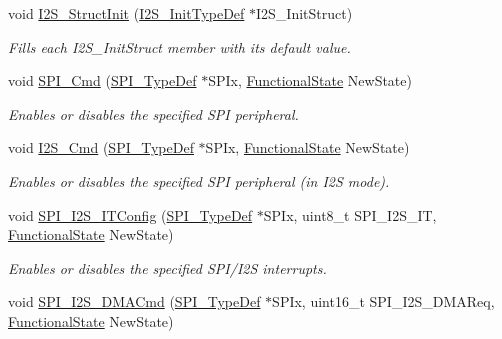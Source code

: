 \begin{DoxyCompactItemize}
void \hyperlink{group___s_p_i___private___functions_ga7470ec1d0759fdeeb42c7fe71a3b41b7}{I2\+S\+\_\+\+Struct\+Init} (\hyperlink{struct_i2_s___init_type_def}{I2\+S\+\_\+\+Init\+Type\+Def} $\ast$I2\+S\+\_\+\+Init\+Struct)
\begin{DoxyCompactList}\small\item\em Fills each I2\+S\+\_\+\+Init\+Struct member with its default value. \end{DoxyCompactList}\item 
void \hyperlink{group___s_p_i___private___functions_gaa31357879a65ee1ed7223f3b9114dcf3}{S\+P\+I\+\_\+\+Cmd} (\hyperlink{struct_s_p_i___type_def}{S\+P\+I\+\_\+\+Type\+Def} $\ast$S\+P\+Ix, \hyperlink{group___exported__types_gac9a7e9a35d2513ec15c3b537aaa4fba1}{Functional\+State} New\+State)
\begin{DoxyCompactList}\small\item\em Enables or disables the specified S\+PI peripheral. \end{DoxyCompactList}\item 
void \hyperlink{group___s_p_i___private___functions_gafe061c71bbc5b4224f3f2884dc53739e}{I2\+S\+\_\+\+Cmd} (\hyperlink{struct_s_p_i___type_def}{S\+P\+I\+\_\+\+Type\+Def} $\ast$S\+P\+Ix, \hyperlink{group___exported__types_gac9a7e9a35d2513ec15c3b537aaa4fba1}{Functional\+State} New\+State)
\begin{DoxyCompactList}\small\item\em Enables or disables the specified S\+PI peripheral (in I2S mode). \end{DoxyCompactList}\item 
void \hyperlink{group___s_p_i___private___functions_ga17f4ef132e8ddbf94cb6b1688d181e41}{S\+P\+I\+\_\+\+I2\+S\+\_\+\+I\+T\+Config} (\hyperlink{struct_s_p_i___type_def}{S\+P\+I\+\_\+\+Type\+Def} $\ast$S\+P\+Ix, uint8\+\_\+t S\+P\+I\+\_\+\+I2\+S\+\_\+\+IT, \hyperlink{group___exported__types_gac9a7e9a35d2513ec15c3b537aaa4fba1}{Functional\+State} New\+State)
\begin{DoxyCompactList}\small\item\em Enables or disables the specified S\+P\+I/\+I2S interrupts. \end{DoxyCompactList}\item 
void \hyperlink{group___s_p_i___private___functions_gabed5b91a8576e6d578f364cc0e807e4a}{S\+P\+I\+\_\+\+I2\+S\+\_\+\+D\+M\+A\+Cmd} (\hyperlink{struct_s_p_i___type_def}{S\+P\+I\+\_\+\+Type\+Def} $\ast$S\+P\+Ix, uint16\+\_\+t S\+P\+I\+\_\+\+I2\+S\+\_\+\+D\+M\+A\+Req, \hyperlink{group___exported__types_gac9a7e9a35d2513ec15c3b537aaa4fba1}{Functional\+State} New\+State)

\end{DoxyCompactItemize}
